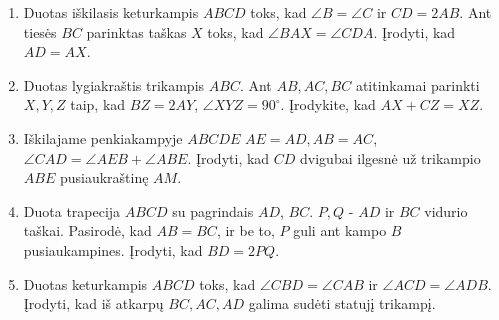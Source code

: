 \begin{enumerate}
\item Duotas iškilasis keturkampis $ABCD$ toks, kad $\angle B = \angle C$
  ir $CD = 2AB$. Ant tiesės $BC$ parinktas taškas $X$ toks, kad $\angle BAX
  = \angle CDA$. Įrodyti, kad $AD = AX$.
\item Duotas lygiakraštis trikampis $ABC$. Ant $AB, AC, BC$ atitinkamai
  parinkti $X, Y, Z$ taip, kad $BZ = 2AY$, $\angle XYZ = 90^\circ$.
  Įrodykite, kad $AX + CZ = XZ$.
\item Iškilajame penkiakampyje $ABCDE$ $AE = AD,AB = AC$, $\angle CAD =
  \angle AEB + \angle ABE$. Įrodyti, kad $CD$ dvigubai ilgesnė už
  trikampio $ABE$ pusiaukraštinę $AM$.
\item Duota trapecija $ABCD$ su pagrindais $AD$, $BC$.  $P,Q$ - $AD$ ir
  $BC$ vidurio taškai. Pasirodė, kad $AB = BC$, ir be to, $P$ guli ant
  kampo $B$ pusiaukampines.  Įrodyti, kad $BD = 2PQ$.
\item Duotas keturkampis $ABCD$ toks, kad $\angle CBD = \angle CAB$ ir
  $\angle ACD = \angle ADB$. Įrodyti, kad iš atkarpų $BC, AC, AD$ galima
  sudėti statujį trikampį.

\end{enumerate}
